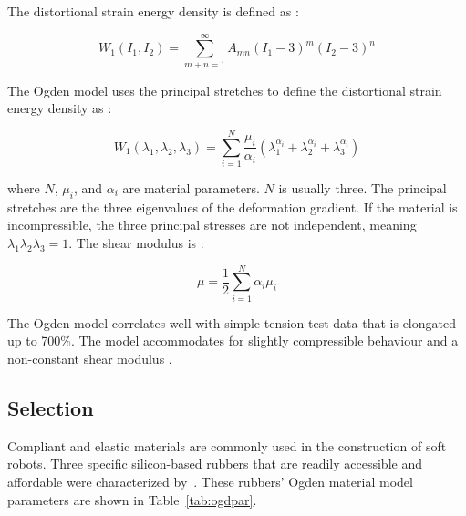 The distortional strain energy density is defined as \citep{Kim2015}:

\begin{equation}
	W_{1}\left ( I_{1},I_{2} \right )=\sum_{m+n=1}^{\infty}A_{mn}\left ( I_{1}-3 \right )^{m}\left ( I_{2}-3 \right )^{n}
\end{equation}

The Ogden model uses the principal stretches to define the distortional strain energy density as \citep{Ogden1972}:

\begin{equation}
	\label{eq:om}
	W_{1}\left ( \lambda_{1},  \lambda_{2}, \lambda_{3} \right )=\sum_{i=1}^{N}\frac{\mu_{i}}{\alpha_{i}}\left ( \lambda_{1}^{\alpha_{i}} + \lambda_{2}^{\alpha_{i}} + \lambda_{3}^{\alpha_{i}} \right )
\end{equation}

where $N$, $\mu_{i}$, and $\alpha_{i}$ are material parameters. $N$ is usually three. The principal stretches are the three eigenvalues of the deformation gradient. If the material is incompressible, the three principal stresses are not independent, meaning $\lambda_{1}\lambda_{2}\lambda_{3}=1$. The shear modulus is \citep{Ogden1972}:

\begin{equation}
	\mu=\frac{1}{2}\sum_{i=1}^{N}\alpha_{i}\mu_{i}
\end{equation}

The Ogden model correlates well with simple tension test data that is elongated up to 700\%. The model accommodates for slightly compressible behaviour and a non-constant shear modulus \citep{Ogden1972, Kim2015}.

\subsection{Selection}

Compliant and elastic materials are commonly used in the construction of soft robots. Three specific silicon-based rubbers that are readily accessible and affordable were characterized by~\cite{Ellis2020}. These rubbers' Ogden material model parameters are shown in Table~\ref{tab:ogdpar}.

